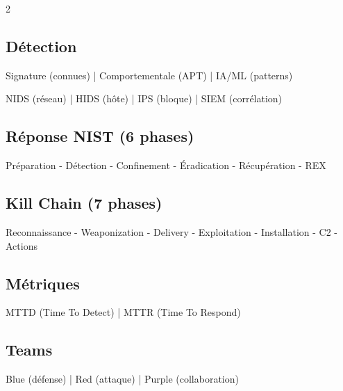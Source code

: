 \documentclass[9pt,a4paper]{extarticle}
\begin{document}
\begin{multicols}{2}
\subsection*{Détection}
Signature (connues) | Comportementale (APT) | IA/ML (patterns)

NIDS (réseau) | HIDS (hôte) | IPS (bloque) | SIEM (corrélation)

\subsection*{Réponse NIST (6 phases)}
Préparation - Détection - Confinement - Éradication - Récupération - REX

\subsection*{Kill Chain (7 phases)}
Reconnaissance - Weaponization - Delivery - Exploitation - Installation - C2 - Actions

\subsection*{Métriques}
MTTD (Time To Detect) | MTTR (Time To Respond)

\subsection*{Teams}
Blue (défense) | Red (attaque) | Purple (collaboration)

\end{multicols}
\end{document}
